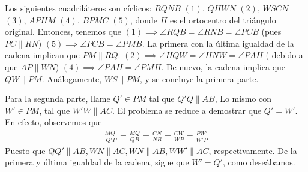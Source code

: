 \begin{sol}
	Los siguientes cuadril\'ateros son c\'iclicos: $RQNB$ $(1)$, $QHWN$  $(2)$, $WSCN$ $(3)$, $APHM$ $(4)$, $BPMC$ $(5)$, donde $H$ es el ortocentro del tri\'angulo original. Entonces, tenemos que $(1) \implies \angle RQB = \angle RNB = \angle PCB$ (pues $PC \parallel RN$) $(5) \implies \angle PCB = \angle PMB$. La primera con la \'ultima igualdad de la cadena implican que $PM \parallel RQ$. $(2) \implies \angle HQW = \angle HNW = \angle PAH$ ( debido a que $AP \parallel WN$) $(4) \implies \angle PAH = \angle PMH$. De nuevo, la cadena implica que $QW \parallel PM$. An\'alogamente, $WS \parallel PM$, y se concluye la primera parte.
	
	Para la segunda parte, llame $Q' \in PM$ tal que $Q'Q \parallel AB$, Lo mismo con $W' \in PM$, tal que $W'W \parallel AC$. El problema se reduce a demostrar que $Q' = W'$. En efecto, observemos que 
	\begin{align}
	\frac{MQ'}{Q'P} = \frac{MQ}{QB} = \frac{CN}{NB} = \frac{CW}{WP} = \frac{PW'}{W'P}
	\end{align}
	Puesto que $QQ' \parallel AB, WN \parallel AC, WN \parallel AB, WW' \parallel AC$, respectivamente. De la primera y \'ultima igualdad de la cadena, sigue que $W' = Q'$, como dese\'abamos. 
\end{sol}

